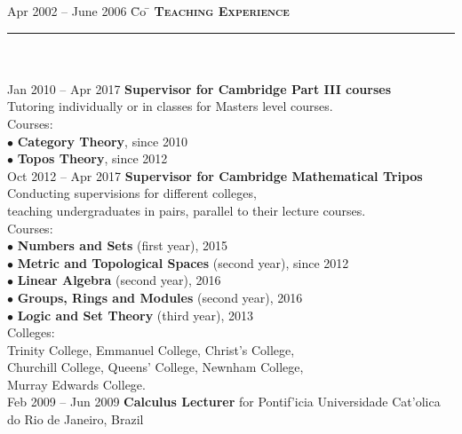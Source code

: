 \documentclass[11pt,a4paper]{article}
\begin{document}
\begin{tabbing}
Apr 2002 -- June 2006 \= Co \=\kill
\> \textbf{\Large{\textsc{Teaching Experience}}} \\
\> \noindent\rule{11cm}{1pt}\\
\> \\
\> Jan 2010 -- Apr 2017  \' \textbf{Supervisor for Cambridge Part III courses}\\ 
\> Tutoring individually or in classes for Masters level courses.\\
\> Courses: \\
\> \> $\bullet$ {\bf Category Theory}, since 2010 \\ 
\> \> $\bullet$ {\bf Topos Theory}, since 2012\\ [5mm]
\> Oct 2012 -- Apr 2017 \' \textbf{Supervisor for Cambridge Mathematical Tripos}\\
\>Conducting supervisions for different colleges, \\ 
\> teaching undergraduates in pairs, parallel to their lecture courses.\\
\> Courses: \\ 
\> \> $\bullet$ {\bf Numbers and Sets} (first year), 2015 \\
\> \> $\bullet$ {\bf Metric and Topological Spaces} (second year), since 2012\\
\> \> $\bullet$ {\bf Linear Algebra} (second year), 2016\\
\> \> $\bullet$ {\bf Groups, Rings and Modules} (second year), 2016\\
\> \> $\bullet$ {\bf Logic and Set Theory} (third year), 2013\\
\> Colleges: \\
\> \> Trinity College, Emmanuel College, Christ's College, \\ 
\> \> Churchill College, Queens' College, Newnham College,\\ 
\> \> Murray Edwards College.\\ [5mm]
\> Feb 2009 -- Jun 2009 \' \textbf{Calculus Lecturer} for Pontif\a'icia Universidade Cat\a'olica\\ \> do Rio de Janeiro, Brazil\\ 
\end{tabbing}
\end{document}
